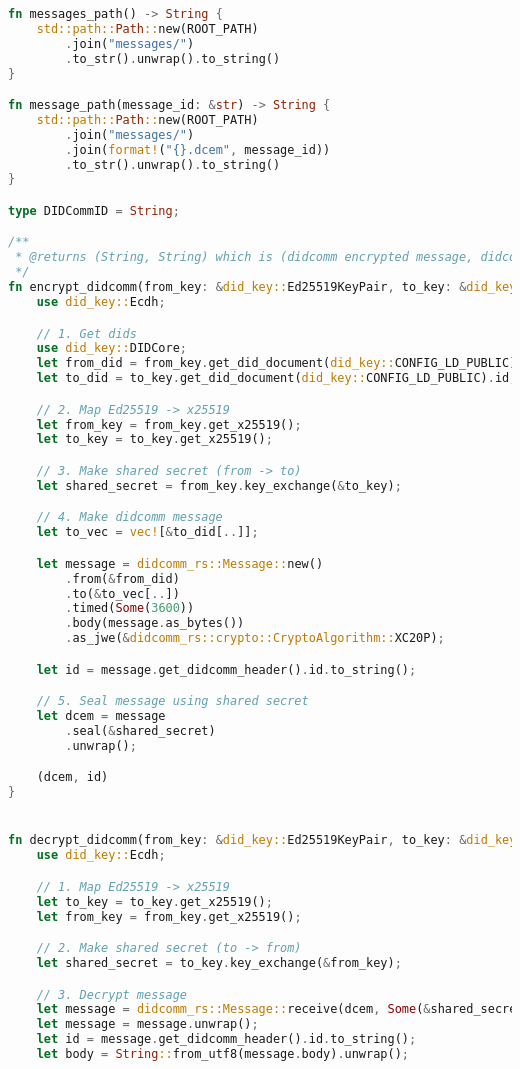 \begin{lstlisting}[language=Rust]
fn messages_path() -> String {
    std::path::Path::new(ROOT_PATH)
        .join("messages/")
        .to_str().unwrap().to_string()
}

fn message_path(message_id: &str) -> String {
    std::path::Path::new(ROOT_PATH)
        .join("messages/")
        .join(format!("{}.dcem", message_id))
        .to_str().unwrap().to_string()
}

type DIDCommID = String;

/**
 * @returns (String, String) which is (didcomm encrypted message, didcomm header id)
 */
fn encrypt_didcomm(from_key: &did_key::Ed25519KeyPair, to_key: &did_key::Ed25519KeyPair, message: &str) -> (String, DIDCommID) {
    use did_key::Ecdh;

    // 1. Get dids
    use did_key::DIDCore;
    let from_did = from_key.get_did_document(did_key::CONFIG_LD_PUBLIC).id;
    let to_did = to_key.get_did_document(did_key::CONFIG_LD_PUBLIC).id;

    // 2. Map Ed25519 -> x25519
    let from_key = from_key.get_x25519();
    let to_key = to_key.get_x25519();

    // 3. Make shared secret (from -> to)
    let shared_secret = from_key.key_exchange(&to_key);

    // 4. Make didcomm message
    let to_vec = vec![&to_did[..]];

    let message = didcomm_rs::Message::new()
        .from(&from_did)
        .to(&to_vec[..])
        .timed(Some(3600))
        .body(message.as_bytes())
        .as_jwe(&didcomm_rs::crypto::CryptoAlgorithm::XC20P);

    let id = message.get_didcomm_header().id.to_string();

    // 5. Seal message using shared secret
    let dcem = message
        .seal(&shared_secret)
        .unwrap();

    (dcem, id)
}


fn decrypt_didcomm(from_key: &did_key::Ed25519KeyPair, to_key: &did_key::Ed25519KeyPair, dcem: &str)-> (String, DIDCommID) {
    use did_key::Ecdh;

    // 1. Map Ed25519 -> x25519
    let to_key = to_key.get_x25519();
    let from_key = from_key.get_x25519();

    // 2. Make shared secret (to -> from)
    let shared_secret = to_key.key_exchange(&from_key);

    // 3. Decrypt message
    let message = didcomm_rs::Message::receive(dcem, Some(&shared_secret), None);
    let message = message.unwrap();
    let id = message.get_didcomm_header().id.to_string();
    let body = String::from_utf8(message.body).unwrap();


\end{lstlisting}
